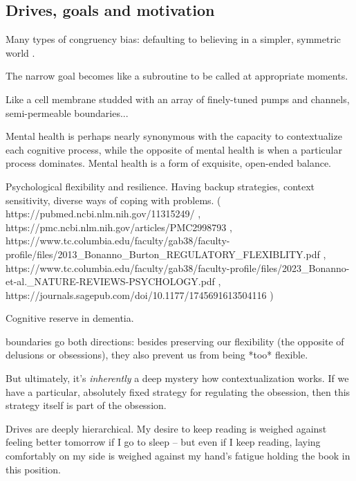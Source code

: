 \subsection{Drives, goals and motivation}

Many types of congruency bias: defaulting to believing in a simpler, symmetric world \citep{shenhav2013expected}.

The narrow goal becomes like a subroutine to be called at appropriate moments. 

Like a cell membrane studded with an array of finely-tuned pumps and channels, semi-permeable boundaries...

Mental health is perhaps nearly synonymous with the capacity to contextualize each cognitive process, while the opposite of mental health is when a particular process dominates. Mental health is a form of exquisite, open-ended balance. 

Psychological flexibility and resilience. Having backup strategies, context sensitivity, diverse ways of coping with problems. ( https://pubmed.ncbi.nlm.nih.gov/11315249/   ,   https://pmc.ncbi.nlm.nih.gov/articles/PMC2998793   ,   https://www.tc.columbia.edu/faculty/gab38/faculty-profile/files/2013_Bonanno_Burton_REGULATORY_FLEXIBLITY.pdf   ,   https://www.tc.columbia.edu/faculty/gab38/faculty-profile/files/2023_Bonanno-et-al._NATURE-REVIEWS-PSYCHOLOGY.pdf   ,   https://journals.sagepub.com/doi/10.1177/1745691613504116 )

Cognitive reserve in dementia. 

boundaries go both directions: besides preserving our flexibility (the opposite of delusions or obsessions), they also prevent us from being *too* flexible. 

But ultimately, it's \textit{inherently} a deep mystery how contextualization works. If we have a particular, absolutely fixed strategy for regulating the obsession, then this strategy itself is part of the obsession. 

Drives are deeply hierarchical. My desire to keep reading is weighed against feeling better tomorrow if I go to sleep -- but even if I keep reading, laying comfortably on my side is weighed against my hand's fatigue holding the book in this position. 

